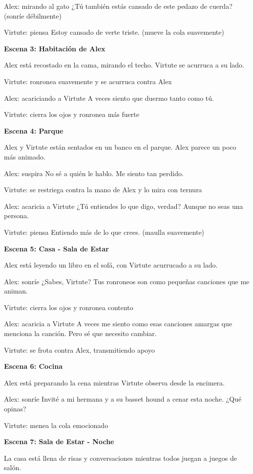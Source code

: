 \documentclass{article}
\begin{document}
Alex: mirando al gato ¿Tú también estás cansado de este pedazo de cuerda? (sonríe débilmente)

Virtute: piensa Estoy cansado de verte triste. (mueve la cola suavemente)

\textbf{\large Escena 3: Habitación de Alex}

Alex está recostado en la cama, mirando el techo. Virtute se acurruca a su lado.

Virtute: ronronea suavemente y se acurruca contra Alex

Alex: acariciando a Virtute A veces siento que duermo tanto como tú.

Virtute: cierra los ojos y ronronea más fuerte

\textbf{\large Escena 4: Parque}

Alex y Virtute están sentados en un banco en el parque. Alex parece un poco más animado.

Alex: suspira No sé a quién le hablo. Me siento tan perdido.

Virtute: se restriega contra la mano de Alex y lo mira con ternura

Alex: acaricia a Virtute ¿Tú entiendes lo que digo, verdad? Aunque no seas una persona.

Virtute: piensa Entiendo más de lo que crees. (maulla suavemente)

\textbf{\large Escena 5: Casa - Sala de Estar}

Alex está leyendo un libro en el sofá, con Virtute acurrucado a su lado.

Alex: sonríe ¿Sabes, Virtute? Tus ronroneos son como pequeñas canciones que me animan.

Virtute: cierra los ojos y ronronea contento

Alex: acaricia a Virtute A veces me siento como esas canciones amargas que menciona la canción. Pero sé que necesito cambiar.

Virtute: se frota contra Alex, transmitiendo apoyo

\textbf{\large Escena 6: Cocina}

Alex está preparando la cena mientras Virtute observa desde la encimera.

Alex: sonríe Invité a mi hermana y a su basset hound a cenar esta noche. ¿Qué opinas?

Virtute: menea la cola emocionado

\textbf{\large Escena 7: Sala de Estar - Noche}

La casa está llena de risas y conversaciones mientras todos juegan a juegos de salón.
\end{document}
